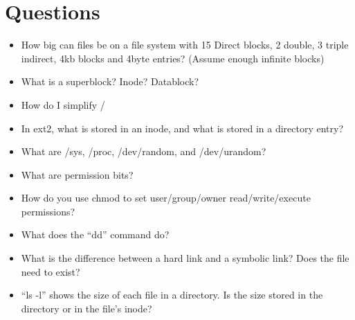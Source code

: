 \section{Questions}\label{questions}

\begin{itemize}
\tightlist
\item
  How big can files be on a file system with 15 Direct blocks, 2 double, 3 triple indirect, 4kb blocks and 4byte entries? (Assume enough infinite blocks)
\item
  What is a superblock? Inode? Datablock?
\item
  How do I simplify /
\item
  In ext2, what is stored in an inode, and what is stored in a directory entry?
\item
  What are /sys, /proc, /dev/random, and /dev/urandom?
\item
  What are permission bits?
\item
  How do you use chmod to set user/group/owner read/write/execute permissions?
\item
  What does the ``dd'' command do?
\item
  What is the difference between a hard link and a symbolic link? Does the file need to exist?
\item
  ``ls -l'' shows the size of each file in a directory. Is the size stored in the directory or in the file's inode?
\end{itemize}


